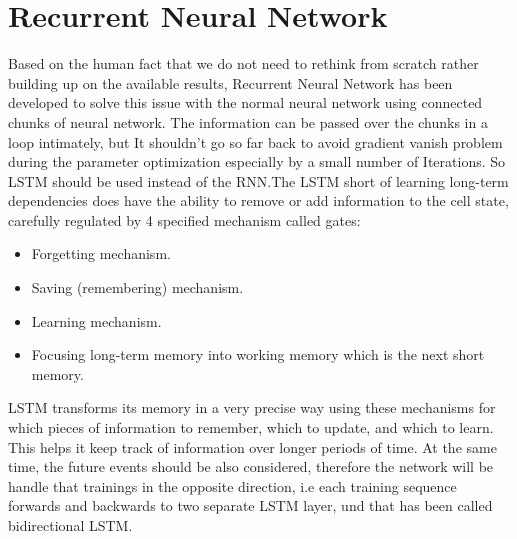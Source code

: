 \section{Recurrent Neural Network}\label{sec:rnn}
Based on the human fact that we do not need to rethink from scratch rather
building up on the available results, Recurrent Neural Network has been
developed to solve this issue with the normal neural network using connected
chunks of neural network. The information can be passed over the chunks in a
loop intimately, but It shouldn’t go so far back to avoid gradient vanish
problem during the parameter optimization especially by a small number of
Iterations. So LSTM should be used instead of the RNN.The LSTM short of learning
long-term dependencies does have the ability to remove or add information to the
cell state, carefully regulated by 4 specified mechanism called gates:
\begin{itemize}
\item Forgetting mechanism.
\item Saving (remembering) mechanism.
\item Learning mechanism.
\item Focusing long-term memory into working memory which is the next short memory.
\end{itemize}
LSTM transforms its memory in a very precise way using these mechanisms for
which pieces of information to remember, which to update, and which to learn.
This helps it keep track of information over longer periods of time. At the same
time, the future events should be also considered, therefore the network will be
handle that trainings in the opposite direction, i.e each training sequence
forwards and backwards to two separate LSTM layer, und that has been called
bidirectional LSTM. 